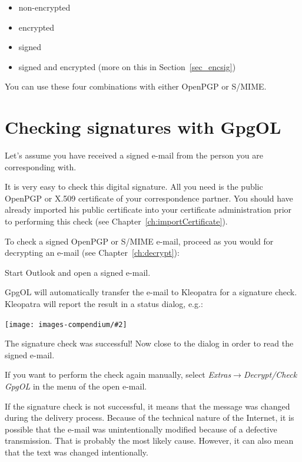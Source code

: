 \documentclass[a4paper,11pt,oneside,openright,titlepage]{scrbook}
\newcommand{\Menu}[1]{\textit{#1}}
\newcommand{\Email}{e-mail}
\newcommand{\IncludeImage}[2][]{
\begin{center}
  \texttt{[image: images-compendium/\#2]}%
\end{center}
}
\begin{document}
\begin{itemize}
    \item non-encrypted

    \item encrypted

    \item signed

    \item signed and encrypted (more on this in Section~\ref{sec_encsig})
\end{itemize}

You can use these four combinations with either OpenPGP or S/MIME.

\clearpage
\section{Checking signatures with GpgOL}

Let's assume you have received a signed \Email{} from the person you
are corresponding with.

It is very easy to check this digital signature. All you need is the
public OpenPGP or X.509 certificate of your correspondence partner.
You should have already imported his public certificate into your
certificate administration prior to performing this check (see
Chapter~\ref{ch:importCertificate}).

To check a signed OpenPGP or S/MIME \Email{}, proceed as you would for
decrypting an \Email{} (see Chapter~\ref{ch:decrypt}):

Start Outlook and open a signed \Email{}.

GpgOL will automatically transfer the \Email{} to Kleopatra for a
signature check. Kleopatra will report the result in a status dialog,
e.g.:

\IncludeImage[width=0.85\textwidth]{sc-kleopatra-verifySignedMail_en}

The signature check was successful! Now close to the dialog in order
to read the signed \Email{}.

If you want to perform the check again manually, select
\Menu{Extras$\rightarrow$Decrypt/Check GpgOL} in the menu of the
open \Email{}.

If the signature check is not successful, it means that the message
was changed during the delivery process. Because of the technical
nature of the Internet, it is possible that the \Email{} was
unintentionally modified because of a defective transmission. That is
probably the most likely cause. However, it can also mean that the
text was changed intentionally.
\end{document}

